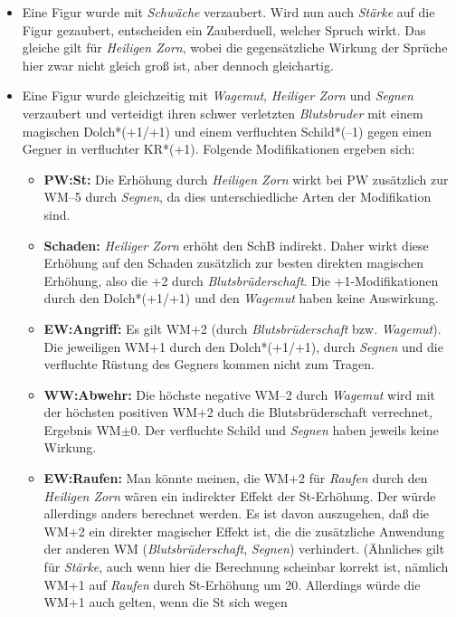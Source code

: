 \documentclass[10pt,a4paper,germanpar]{article}
\begin{document}
\begin{itemize}
\item Eine Figur wurde mit \emph{Schwäche} verzaubert. Wird nun auch
  \emph{Stärke} auf die Figur gezaubert, entscheiden ein Zauberduell,
  welcher Spruch wirkt. Das gleiche gilt für \emph{Heiligen Zorn},
  wobei die gegensätzliche Wirkung der Sprüche hier zwar nicht gleich
  groß ist, aber dennoch gleichartig.
\item Eine Figur wurde gleichzeitig mit \emph{Wagemut}, \emph{Heiliger
    Zorn} und \emph{Segnen} verzaubert und verteidigt
  ihren schwer verletzten \emph{Blutsbruder} mit einem magischen
  Dolch*(+1/+1) und einem verfluchten Schild*(--1) gegen einen Gegner
  in verfluchter KR*(+1). Folgende Modifikationen ergeben sich:
  \begin{itemize}
  \item \textbf{PW:St:} Die Erhöhung durch \emph{Heiligen Zorn} wirkt bei
    PW zusätzlich zur WM--5 durch \emph{Segnen}, da dies
    unterschiedliche Arten der Modifikation sind.
  \item \textbf{Schaden:} \emph{Heiliger Zorn} erhöht den SchB
    indirekt. Daher wirkt diese Erhöhung auf den Schaden zusätzlich
    zur besten direkten magischen Erhöhung, also die +2 durch
    \emph{Blutsbrüderschaft}. Die +1-Modifikationen durch den
    Dolch*(+1/+1) und den \emph{Wagemut} haben keine Auswirkung.
  \item \textbf{EW:Angriff:} Es gilt WM+2 (durch
    \emph{Blutsbrüderschaft} bzw. \emph{Wagemut}). Die jeweiligen WM+1
    durch den Dolch*(+1/+1), durch \emph{Segnen} und die verfluchte
    Rüstung des Gegners kommen nicht zum Tragen.
  \item \textbf{WW:Abwehr:} Die höchste negative WM--2 durch
    \emph{Wagemut} wird mit der höchsten positiven WM+2 duch die
    Blutsbrüderschaft verrechnet, Ergebnis WM$\pm$0. Der verfluchte
    Schild und \emph{Segnen} haben jeweils keine Wirkung.
  \item \textbf{EW:Raufen:} Man könnte meinen, die WM+2 für
    \emph{Raufen} durch den \emph{Heiligen Zorn} wären ein indirekter
    Effekt der St-Erhöhung. Der würde allerdings anders berechnet
    werden. Es ist davon auszugehen, daß die WM+2 ein direkter
    magischer Effekt ist, die die zusätzliche Anwendung der anderen WM
    (\emph{Blutsbrüderschaft}, \emph{Segnen}) verhindert. (Ähnliches
    gilt für \emph{Stärke}, auch wenn hier die Berechnung scheinbar
    korrekt ist, nämlich WM+1 auf \emph{Raufen} durch St-Erhöhung um
    20. Allerdings würde die WM+1 auch gelten, wenn die St sich wegen

\end{itemize}
\end{itemize}
\end{document}

